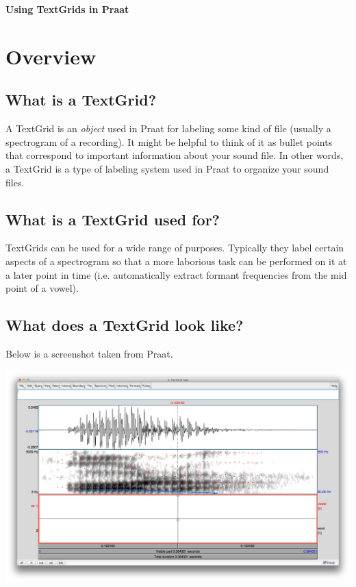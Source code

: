 \documentclass[12pt]{article}
\begin{document}
	\begin{center}
		\Large{\textbf{Using TextGrids in Praat}}
	\end{center}

\section{Overview} %
\label{sec:overview}

\subsection{What is a TextGrid?} %
\label{sub:what_is_a_TextGrid_}

A TextGrid is an \emph{object} used in Praat for labeling some kind of file (usually a spectrogram of a recording). It might be helpful to think of it as bullet points that correspond to important information about your sound file. In other words, a TextGrid is a type of labeling system used in Praat to organize your sound files. 



\subsection{What is a TextGrid used for?} %
\label{sub:what_is_a_TextGrid_used_for_}



TextGrids can be used for a wide range of purposes. Typically they label certain aspects of a spectrogram so that a more laborious task can be performed on it at a later point in time (i.e. automatically extract formant frequencies from the mid point of a vowel). 


\subsection{What does a TextGrid look like?} %
\label{sub:what_does_a_TextGrid_look_like_}


Below is a screenshot taken from Praat.

\begin{center}
	\includegraphics[scale=.12]{tg1.png}
\end{center}
\end{document}
